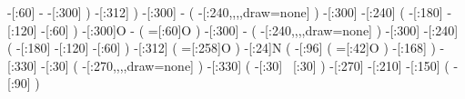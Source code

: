{                      -[:60]%
                           -%
                     -[:300]%
                           )
                 -[:312]%
                       )
             -[:300]%
                   -%
                       (
    -[:240,,,,draw=none]%
                       )
             -[:300]%
             -[:240]%
                       (
                 -[:180]%
                 -[:120]%
                  -[:60]%
                       )
             -[:300]O%
                   -%
                       (
                  =[:60]O%
                       )
             -[:300]%
                   -%
                       (
    -[:240,,,,draw=none]%
                       )
             -[:300]%
             -[:240]%
                       (
                 -[:180]%
                 -[:120]%
                  -[:60]%
                       )
             -[:312]%
                       (
                 =[:258]O%
                       )
              -[:24]N%
                       (
                  -[:96]%
                           (
                      =[:42]O%
                           )
                 -[:168]%
                       )
             -[:330]%
              -[:30]%
                       (
    -[:270,,,,draw=none]%
                       )
             -[:330]%
                       (
                  -[:30]%
                  ~[:30]%
                       )
             -[:270]%
             -[:210]%
             -[:150]%
                       (
                  -[:90]%
                       )
}

